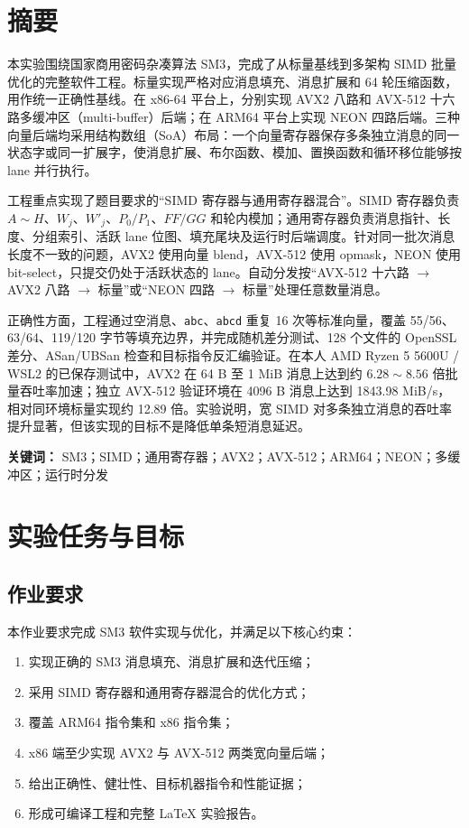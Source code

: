 \documentclass[UTF8,a4paper,12pt]{ctexart}
\newcommand{\code}[1]{\texttt{#1}}
\begin{document}
\section*{摘要}
本实验围绕国家商用密码杂凑算法 SM3，完成了从标量基线到多架构 SIMD 批量优化的完整软件工程。标量实现严格对应消息填充、消息扩展和 64 轮压缩函数，用作统一正确性基线。在 x86-64 平台上，分别实现 AVX2 八路和 AVX-512 十六路多缓冲区（multi-buffer）后端；在 ARM64 平台上实现 NEON 四路后端。三种向量后端均采用结构数组（SoA）布局：一个向量寄存器保存多条独立消息的同一状态字或同一扩展字，使消息扩展、布尔函数、模加、置换函数和循环移位能够按 lane 并行执行。

工程重点实现了题目要求的“SIMD 寄存器与通用寄存器混合”。SIMD 寄存器负责 $A\sim H$、$W_j$、$W'_j$、$P_0/P_1$、$FF/GG$ 和轮内模加；通用寄存器负责消息指针、长度、分组索引、活跃 lane 位图、填充尾块及运行时后端调度。针对同一批次消息长度不一致的问题，AVX2 使用向量 blend，AVX-512 使用 opmask，NEON 使用 bit-select，只提交仍处于活跃状态的 lane。自动分发按“AVX-512 十六路 $\rightarrow$ AVX2 八路 $\rightarrow$ 标量”或“NEON 四路 $\rightarrow$ 标量”处理任意数量消息。

正确性方面，工程通过空消息、\code{abc}、\code{abcd} 重复 16 次等标准向量，覆盖 55/56、63/64、119/120 字节等填充边界，并完成随机差分测试、128 个文件的 OpenSSL 差分、ASan/UBSan 检查和目标指令反汇编验证。在本人 AMD Ryzen 5 5600U / WSL2 的已保存测试中，AVX2 在 64 B 至 1 MiB 消息上达到约 $6.28\sim 8.56$ 倍批量吞吐率加速；独立 AVX-512 验证环境在 4096 B 消息上达到 1843.98 MiB/s，相对同环境标量实现约 12.89 倍。实验说明，宽 SIMD 对多条独立消息的吞吐率提升显著，但该实现的目标不是降低单条短消息延迟。

\noindent\textbf{关键词：} SM3；SIMD；通用寄存器；AVX2；AVX-512；ARM64；NEON；多缓冲区；运行时分发

\clearpage
\tableofcontents
\clearpage
{}

\section{实验任务与目标}

\subsection{作业要求}
本作业要求完成 SM3 软件实现与优化，并满足以下核心约束：
\begin{enumerate}
  \item 实现正确的 SM3 消息填充、消息扩展和迭代压缩；
  \item 采用 SIMD 寄存器和通用寄存器混合的优化方式；
  \item 覆盖 ARM64 指令集和 x86 指令集；
  \item x86 端至少实现 AVX2 与 AVX-512 两类宽向量后端；
  \item 给出正确性、健壮性、目标机器指令和性能证据；
  \item 形成可编译工程和完整 LaTeX 实验报告。
\end{enumerate}
\end{document}
